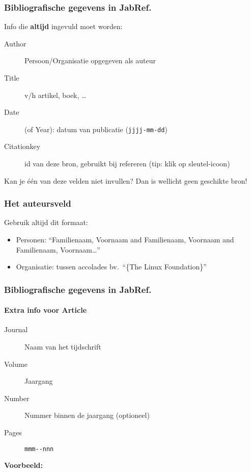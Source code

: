 \documentclass[aspectratio=169]{beamer}
\begin{document}
\begin{frame}
  \frametitle{Bibliografische gegevens in JabRef.}

  Info die \textbf{altijd} ingevuld moet worden:

  \begin{description}
    \item[Author] Persoon/Organisatie opgegeven als auteur
    \item[Title] v/h artikel, boek, \ldots
    \item[Date] (of Year): datum van publicatie (\texttt{jjjj-mm-dd})
    \item[Citationkey] id van deze bron, gebruikt bij refereren (tip: klik op sleutel-icoon)
  \end{description}

  \bigskip

  Kan je één van deze velden niet invullen? Dan is wellicht geen geschikte bron!
\end{frame}

\begin{frame}
  \frametitle{Het auteursveld}

  Gebruik altijd dit formaat:

  \begin{itemize}
    \item Personen: ``Familienaam, Voornaam and Familienaam, Voornaam and Familienaam, Voornaam\ldots''
    \item Organisatie: tussen accolades bv.\ ``\{The Linux Foundation\}''
  \end{itemize}

\end{frame}

\begin{frame}
  \frametitle{Bibliografische gegevens in JabRef.}
  \framesubtitle{Extra info voor Article}

  \begin{description}
    \item[Journal] Naam van het tijdschrift
    \item[Volume] Jaargang
    \item[Number] Nummer binnen de jaargang (optioneel)
    \item[Pages] \verb|mmm--nnn|
  \end{description}

  \bigskip

  \textbf{Voorbeeld:}

\end{frame}
\end{document}
